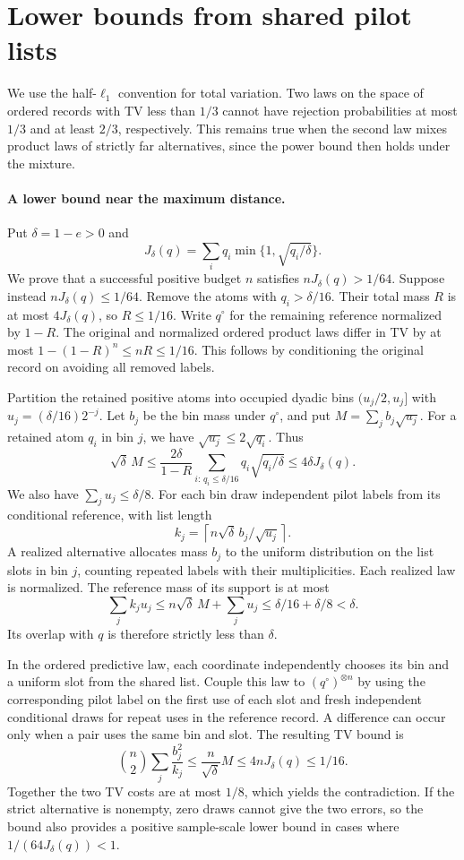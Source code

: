 \section{Lower bounds from shared pilot lists}
\label{sec:pilot-lower}

We use the half-\(\ell_1\) convention for total variation. Two laws
on the space of ordered records with TV less than \(1/3\) cannot have
rejection probabilities at most \(1/3\) and at least \(2/3\), respectively.
This remains true when the second law mixes product laws of strictly
far alternatives, since the power bound then holds under the mixture.

\paragraph{A lower bound near the maximum distance.}
Put \(\delta=1-e>0\) and
\[
 J_\delta(q)=\sum_i q_i\min\{1,\sqrt{q_i/\delta}\}.
\]
We prove that a successful positive budget \(n\) satisfies
\(nJ_\delta(q)>1/64\). Suppose instead \(nJ_\delta(q)\leq 1/64\).
Remove the atoms with \(q_i>\delta/16\). Their total mass \(R\) is
at most \(4J_\delta(q)\), so \(R\leq 1/16\). Write \(q^\circ\) for
the remaining reference normalized by \(1-R\).
The original and normalized ordered product laws differ in TV by at
most \(1-(1-R)^n\leq nR\leq 1/16\). This follows by conditioning the
original record on avoiding all removed labels.

Partition the retained positive atoms into occupied dyadic bins
\((u_j/2,u_j]\) with \(u_j=(\delta/16)2^{-j}\). Let \(b_j\) be the
bin mass under \(q^\circ\), and put \(M=\sum_j b_j\sqrt{u_j}\).
For a retained atom \(q_i\) in bin \(j\), we have
\(\sqrt{u_j}\leq 2\sqrt{q_i}\). Thus
\[
 \sqrt{\delta}\,M
 \leq \frac{2\delta}{1-R}
          \sum_{i:\,q_i\leq \delta/16}q_i\sqrt{q_i/\delta}
 \leq 4\delta J_\delta(q).
\]
We also have \(\sum_j u_j\leq \delta/8\).
For each bin draw independent pilot labels from its conditional
reference, with list length
\[
 k_j=\left\lceil n\sqrt{\delta}\,b_j/\sqrt{u_j}\right\rceil.
\]
A realized alternative allocates mass \(b_j\) to the uniform
distribution on the list slots in bin \(j\), counting repeated
labels with their multiplicities. Each realized law is normalized.
The reference mass of its support is at most
\[
 \sum_j k_j u_j
 \leq n\sqrt{\delta}\,M+\sum_j u_j
 \leq \delta/16+\delta/8<\delta.
\]
Its overlap with \(q\) is therefore strictly less than \(\delta\).

In the ordered predictive law, each coordinate independently
chooses its bin and a uniform slot from the shared list. Couple
this law to \((q^\circ)^{\otimes n}\) by using the corresponding
pilot label on the first use of each slot and fresh independent
conditional draws for repeat uses in the reference record. A
difference can occur only when a pair uses the same bin and slot.
The resulting TV bound is
\[
 \binom n2\sum_j\frac{b_j^2}{k_j}
 \leq \frac{n}{\sqrt{\delta}}M
 \leq 4nJ_\delta(q)\leq 1/16.
\]
Together the two TV costs are at most \(1/8\), which yields the
contradiction. If the strict alternative is nonempty, zero draws
cannot give the two errors, so the bound also provides a positive
sample-scale lower bound in cases where \(1/(64J_\delta(q))<1\).

